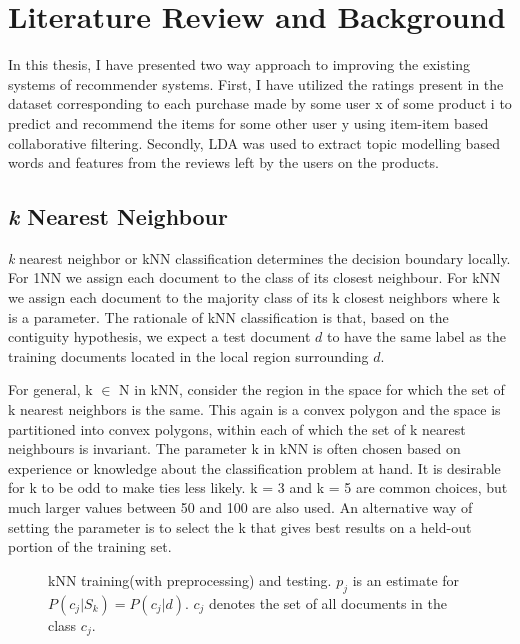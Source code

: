 \chapter{Literature Review and Background}
In this thesis, I have presented two way approach to improving the existing systems of recommender systems.
First, I have utilized the ratings present in the dataset corresponding to each purchase made by some user x of some product i to predict and recommend the items for some other user y using item-item based collaborative filtering. Secondly, LDA was used to extract topic modelling based words and features from the reviews left by the users on the products.

\section{\textit{k} Nearest Neighbour}
\textit{k} nearest neighbor or kNN classification determines the decision boundary locally. For 1NN we assign each document to the class of its closest neighbour. For kNN we assign each document to the majority class of its k closest neighbors where k is a parameter. The rationale of kNN classification is that, based on the contiguity hypothesis, we expect a test document $d$ to have the same label as the training documents located in the local region
surrounding $d$.

For general, k $\in$ N in kNN, consider the region in the space for which the set of k nearest neighbors is the same. This again is a convex polygon and the space is partitioned into convex polygons, within each of which the set of k nearest neighbours is invariant.
The parameter k in kNN is often chosen based on experience or knowledge about the classification problem at hand.  It is desirable for k to be odd to make ties less likely. k = 3 and k = 5 are common choices, but much larger values between 50 and 100 are also used.  An alternative way of setting the parameter is to select the k that gives best results on a held-out portion of the training set.
\begin{figure}[H]
    {\par}
    \caption{kNN  training(with preprocessing) and testing. $p_{j}$ is an estimate for $P(c_{j}|S_{k}) = P(c_{j}|d)$. $c_{j}$ denotes the set of all documents in the class $c_{j}$.}
\end{figure}

